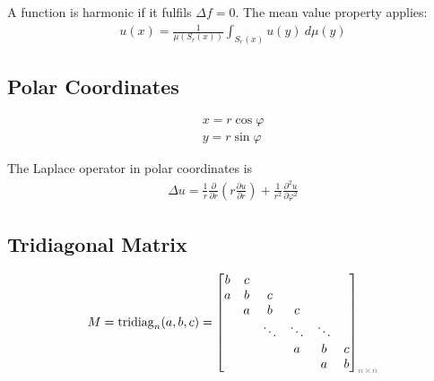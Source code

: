A function is harmonic if it fulfils $\Delta f = 0$. The mean value property applies:
\begin{align*}
	u(x) = \frac{1}{\mu(S_r(x))}\int_{S_r(x)}u(y)\ d\mu(y)
\end{align*}

\subsection{Polar Coordinates}
\begin{align*}
	x = r\cos \varphi \\
	y = r\sin \varphi
\end{align*}

The Laplace operator in polar coordinates is
\begin{align*}
	\Delta u = \frac{1}{r}\frac{\partial}{\partial r}
	\left(r\frac{\partial u}{\partial r}\right)
	+\frac{1}{r^2}\frac{\partial^2 u}{\partial \varphi^2}
\end{align*}

\subsection{Tridiagonal Matrix}
\begin{align*}
    M = \mathrm{tridiag}_{n}(a, b, c) =
    \begin{bmatrix}
        b & c & & & & \\
        a & b & c & & & \\
        & a & b & c & & \\
        & & \ddots & \ddots & \ddots & \\
        & & & a & b & c \\
        & & & & a & b
    \end{bmatrix}_{\color{gray}n\times n}
\end{align*}
